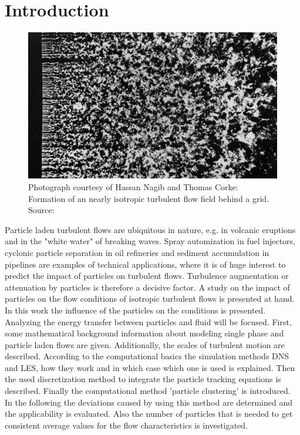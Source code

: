 \documentclass[11pt,a4paper,openany,oneside,parskip=half*]{article}
\begin{document}
\section{Introduction}
\begin{figure}[h]
	\centering
  \includegraphics[width=\textwidth]{./Abbildungen/TurbulentMotion_Introduction.png}
	\caption{Photograph courtesy of Hassan Nagib and Thomas Corke: Formation of an nearly isotropic turbulent flow field behind a grid. Source: \cite{albumOfFluidMotion}}
	\label{introduction_picture}
\end{figure}
Particle laden turbulent flows are ubiquitous in nature, e.g. in volcanic eruptions and in the "white water" of breaking waves.
Spray automization in fuel injectors, cyclonic particle separation in oil refineries and sediment accumulation in pipelines are examples of technical applications, where it is of huge interest to predict the impact of particles on turbulent flows.
Turbulence augmentation or attenuation by particles is therefore a decisive factor.
\newline
A study on the impact of particles on the flow conditions of isotropic turbulent flows is presented at hand.
In this work the influence of the particles on the conditions is presented. Analyzing the energy transfer between particles and fluid will be focused.  
\newline
First, some mathematical background information about modeling single phase and particle laden flows are given. 
Additionally, the scales of turbulent motion are described.
According to the computational basics the simulation methods DNS and LES, how they work and in which case which one is used is explained.
Then the used discretization method to integrate the particle tracking equations is described.     
Finally the computational method 'particle clustering' is introduced. 
In the following the deviations caused by using this method are determined and the applicability is evaluated.
Also the number of particles that is needed to get consistent average values for the flow characteristics is investigated.
\end{document}
